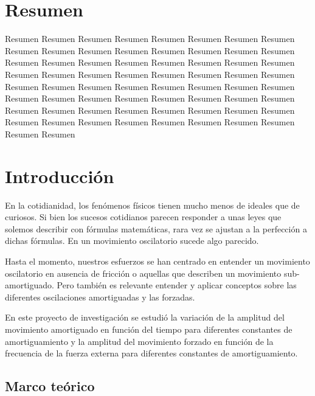 \documentclass[spanish,notitlepage,letterpaper, 12pt]{article}
\begin{document}

\tableofcontents

\newpage

\section{Resumen}
Resumen Resumen Resumen Resumen Resumen Resumen Resumen Resumen Resumen Resumen Resumen Resumen Resumen Resumen Resumen Resumen Resumen Resumen Resumen Resumen Resumen Resumen Resumen Resumen Resumen Resumen Resumen Resumen Resumen Resumen Resumen Resumen Resumen Resumen Resumen Resumen Resumen Resumen Resumen Resumen Resumen Resumen Resumen Resumen Resumen Resumen Resumen Resumen Resumen Resumen Resumen Resumen Resumen Resumen Resumen Resumen Resumen Resumen Resumen Resumen Resumen Resumen Resumen Resumen Resumen Resumen
\section{Introducción}
En la cotidianidad, los fenómenos físicos tienen mucho menos de ideales que de curiosos.
Si bien los sucesos cotidianos parecen responder a unas leyes que solemos describir con fórmulas matemáticas, rara vez se ajustan a la perfección a dichas fórmulas. En un movimiento oscilatorio sucede algo parecido.\par
\bigskip
Hasta el momento, nuestros esfuerzos se han centrado en entender un movimiento oscilatorio en ausencia de fricción o aquellas que describen un movimiento sub-amortiguado. Pero también es relevante entender y aplicar conceptos sobre las diferentes oscilaciones amortiguadas y las forzadas.\par
\bigskip
En este proyecto de investigación se estudió la variación de la amplitud del
movimiento amortiguado en función del tiempo para diferentes constantes de
amortiguamiento y la amplitud del movimiento forzado en función de la frecuencia de la
fuerza externa para diferentes constantes de amortiguamiento.
\subsection{Marco teórico} \label{I.MT}
\end{document}
